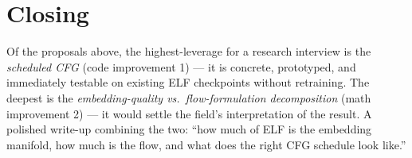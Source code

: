 \documentclass[11pt]{article}
\begin{document}
\section*{Closing}

Of the proposals above, the highest-leverage for a research interview is the \emph{scheduled CFG} (code improvement 1) --- it is concrete, prototyped, and immediately testable on existing ELF checkpoints without retraining. The deepest is the \emph{embedding-quality vs.\ flow-formulation decomposition} (math improvement 2) --- it would settle the field's interpretation of the result. A polished write-up combining the two: ``how much of ELF is the embedding manifold, how much is the flow, and what does the right CFG schedule look like.''



\end{document}
